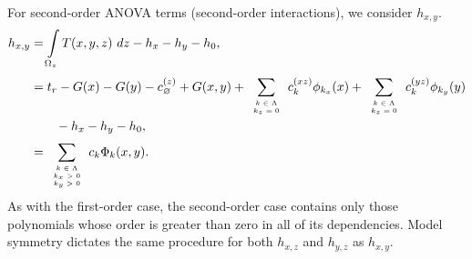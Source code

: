 For second-order ANOVA terms (second-order interactions), we consider $h_{x,y}$.
\begin{align}
  h_{x,y} &= \int\limits_{\Omega_{z}} T(x,y,z)\ dz - h_x - h_y - h_0,\\ \nonumber
    &= t_r - G(x) - G(y) - c^{(z)}_\varnothing + G(x,y) + \sum_{\tiny\begin{array}{c}k\in\Lambda\\k_z=0\end{array}}^{} c^{(xz)}_k\phi_{k_x}(x)
    + \sum_{\tiny\begin{array}{c}k\in\Lambda\\k_z=0\end{array}}^{} c^{(yz)}_k\phi_{k_y}(y) \\ \nonumber 
    & \hspace{20pt} - h_x - h_y - h_0, \\ \nonumber
  &= \sum_{\tiny\begin{array}{c}k\in\Lambda\\k_x>0\\k_y>0\end{array}}^{} c_k \Phi_k(x,y).
\end{align}
As with the first-order case, the second-order case contains only those polynomials whose order is greater than zero in
all of its dependencies.  Model symmetry dictates the same procedure for both $h_{x,z}$ and $h_{y,z}$ as $h_{x,y}$.


